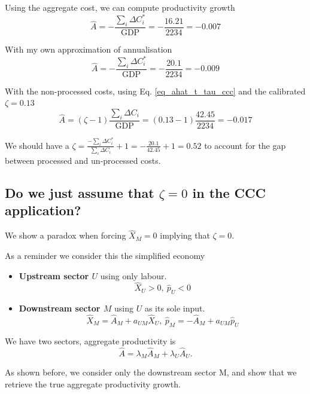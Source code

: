 \documentclass[11pt]{article}
\begin{document}
Using the aggregate cost, we can compute productivity growth
\[
\hat{A}=-\frac{\sum_i \Delta C^*_i}{\text{GDP}}=-\frac{16.21}{2234}=-0.007
\]

With my own approximation of annualisation
\[
\hat{A}=-\frac{\sum_i \Delta C^*_i}{\text{GDP}}=-\frac{20.1}{2234}=-0.009
\]

With the non-processed costs, using  Eq. \eqref{eq_ahat_t_tau_ccc} and the calibrated $\zeta=0.13$
\[
\hat{A}=(\zeta-1)\frac{\sum_i \Delta C_i}{\text{GDP}}=(0.13-1)\frac{42.45}{2234}=-0.017
\]

We should have a $\zeta=\frac{-\sum_i \Delta C^*_i}{\sum_i \Delta C_i}+1=-\frac{20.1}{42.45}+1=0.52$ to account for the gap between processed and un-processed costs. 


\subsection{Do we just assume that $\zeta=0$ in the CCC application?}

We show a paradox when forcing $\hat{X}_M=0$ implying that $\zeta=0$.

As a reminder we consider this the simplified economy
\begin{itemize}
    \item \textbf{Upstream sector $U$} using only labour. 
    \[
    \hat{X}_U > 0,~
    \hat{p}_U < 0
    \]
    \item \textbf{Downstream sector $M$} using $U$ as its sole input. 
    \[
    \hat{X}_M = \hat{A}_M+a_{UM}  \hat{X}_U,~
    \hat{p}_M = -\hat{A}_M+a_{UM}  \hat{p}_U
    \]
\end{itemize}



We have two sectors, aggregate productivity is
\begin{equation*}
    \hat{A}=\lambda_M \hat{A}_M+\lambda_U \hat{A}_U.
\end{equation*}

As shown before, we consider only the downstream sector M, and show that we retrieve the true aggregate productivity growth.
\end{document}
